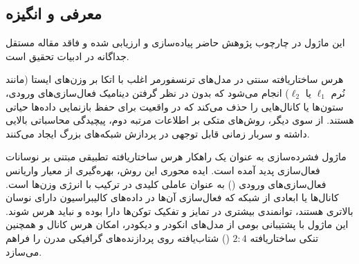 \subsection{معرفی و انگیزه}
این ماژول در چارچوب پژوهش حاضر پیاده‌سازی و ارزیابی شده و فاقد مقاله مستقل جداگانه در ادبیات تحقیق است.

هرس ساختاریافته سنتی در مدل‌های ترنسفورمر اغلب با اتکا بر وزن‌های ایستا (مانند نُرم $\ell_1$ یا $\ell_2$) انجام می‌شود که بدون در نظر گرفتن دینامیک فعال‌سازی‌های ورودی، ستون‌ها یا کانال‌هایی را حذف می‌کند که در واقعیت برای حفظ بازنمایی داده‌ها حیاتی هستند. از سوی دیگر، روش‌های متکی بر اطلاعات مرتبه دوم، پیچیدگی محاسباتی بالایی داشته و سربار زمانی قابل توجهی در پردازش شبکه‌های بزرگ ایجاد می‌کنند.

ماژول فشرده‌سازی  به عنوان یک راهکار هرس ساختاریافته تطبیقی مبتنی بر نوسانات فعال‌سازی پدید آمده است. ایده محوری این روش، بهره‌گیری از معیار واریانس فعال‌سازی‌های ورودی () به عنوان عاملی کلیدی در ترکیب با انرژی وزن‌ها است. کانال‌ها یا ابعادی از شبکه که فعال‌سازی آن‌ها در داده‌های کالیبراسیون دارای نوسان بالاتری هستند، توانمندی بیشتری در تمایز و تفکیک توکن‌ها دارا بوده و نباید هرس شوند. این ماژول با پشتیبانی بومی از مدل‌های انکودر و دیکودر، امکان هرس کانال و همچنین تنکی ساختاریافته $2:4$ () شتاب‌یافته روی پردازنده‌های گرافیکی مدرن را فراهم می‌سازد.
